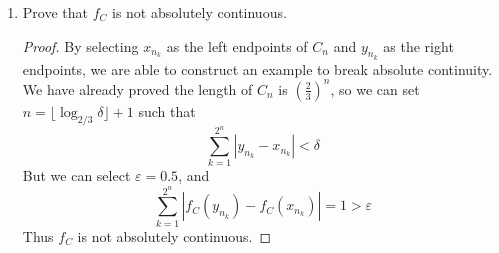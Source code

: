 \begin{enumerate}
\begin{enumerate}[(a)]
\begin{proof}
        \[ \forall x,y\in[0,1] \textrm{ with } |x-y|<\delta=\frac{1}{3^n} \]
        then the base-3 expansion of $x$ and $y$ agree for at least the first $n$ terms, which implies
        \[|f_C(x)-f_C(y)|\leq \sum_{j=n+1}^\infty \frac{1}{2^j}=\frac{1}{2^n}<\varepsilon \]
        This gives the uniform continuity of $f_C$ on \([0,1]\).
        \end{proof}
        \item Monotonically increasing (non-decreasing);
        \begin{proof}
        We can prove by the explicit form of the Cantor function
	\[ f_C(x)=f_C\left(\sum_{i=1}^\infty \frac{a_i}{3^i} \right) = \sum_{i=1}^{N_x} \frac{b_n}{2^n}  \]
        where $N_x$ denotes the smallest $i$ such that \(a_{i}=1\) if it exists or \(N_x=\infty\) if there is no such \(a_{i}\), and
	\[ b_n=\begin{cases} a_n/2 & n<N_x \\ 1 & n=N_x \end{cases} \]
	which is the binary expansion of a number in \([0,1]\).
	This is a monotonely increaseing transformation from \(a_n\) to \(b_n\) for \(n<N_x\), and monotonely non-decreasing for \(n=N_x\).
	Thus, if \(x<y\), then their tenary expansions must differ at some point $N$ and at that point \(a_{Nx}<a_{Ny}\).
        The monotocity is preserved by the mapping \(a_n\to b_n\), and is also preserved by binary expansion.
	Thus, the combination, Cantor function, is monotonely non-decreasing.
	\end{proof}
        \item Differentiable almost everywhere, with \(f'(x)=0\);
        \begin{proof}
        By definition, \(f_C(x)\) is constant when \(x\in [0,1]\backslash C\), and the constant function has \(f'_C(x)=0\).
        Since \([0,1]\backslash C\) has Lebesgue measure 1, it is almost everywhere differentiable.
        \end{proof}
    \end{enumerate}
    \item Prove that $f_C$ is not absolutely continuous.
    \begin{proof}
    By selecting \(x_{n_k}\) as the left endpoints of \(C_n\) and \(y_{n_k}\) as the right endpoints, we are able to construct an example to break absolute continuity.
    We have already proved the length of $C_n$ is \(\left(\frac{2}{3}\right)^n\), so we can set \(n=\lfloor\log_{2/3}\delta\rfloor+1 \) such that
    \[ \sum_{k=1}^{2^{n}}|y_{n_k}-x_{n_k}|<\delta \]
    But we can select \(\varepsilon=0.5\), and
    \[ \sum_{k=1}^{2^{n}}|f_C(y_{n_k})-f_C(x_{n_k})|=1>\varepsilon \]
    Thus $f_C$ is not absolutely continuous.
    \end{proof}
\end{enumerate}

